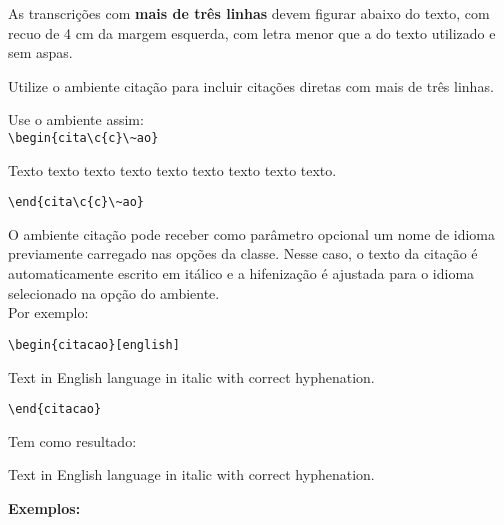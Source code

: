 As transcri\c{c}\~oes com \textbf{mais de tr\^es linhas} devem figurar abaixo do texto, com recuo de 4 cm da margem esquerda, com letra menor que a do texto utilizado e sem aspas. 

Utilize o ambiente cita\c{c}\~ao para incluir cita\c{c}\~oes diretas com mais de tr\^es linhas.

Use o ambiente assim: \\

\verb+\begin{cita\c{c}\~ao}+

Texto texto texto texto texto texto texto texto texto.

\verb+\end{cita\c{c}\~ao}+

O ambiente cita\c{c}\~ao pode receber como par\^ametro opcional um nome de idioma previamente carregado nas op\c{c}\~oes da classe. Nesse caso, o texto da cita\c{c}\~ao \'e automaticamente escrito em it\'alico e a hifeniza\c{c}\~ao \'e ajustada para o idioma selecionado na op\c{c}\~ao do ambiente.\\
  Por exemplo:
 
\verb+\begin{citacao}[english]+
 
 Text in English language in italic with correct hyphenation.
 
\verb+\end{citacao}+
 
Tem como resultado:
\begin{citacao}[english]
Text in English language in italic with correct hyphenation. \\
\end{citacao}

\textbf{Exemplos:} 

